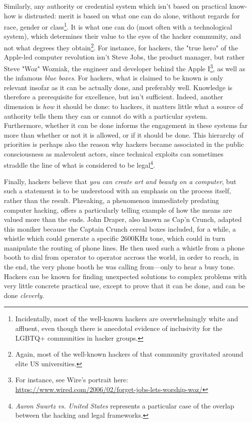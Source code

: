 \documentclass{article}
\begin{document}
Similarly, any authority or credential system which isn't based on practical know-how is distrusted: merit is based on what one can do alone, without regards for race, gender or class\footnote{Incidentally, most of the well-known hackers are overwhelmingly white and affluent, even though there is anecdotal evidence of inclusivity for the LGBTQ+ communities in hacker groups.}. It is what one can do (most often with a technological system), which determines their value to the eyes of the hacker community, and not what degrees they obtain\footnote{Again, most of the well-known hackers of that community gravitated around elite US universities.}. For instance, for hackers, the "true hero" of the Apple-led computer revolution isn't Steve Jobs, the product manager, but rather Steve "Woz" Wozniak, the engineer and developer behind the Apple I\footnote{For instance, see Wire's portrait here: \url{https://www.wired.com/2006/02/forget-jobs-lets-worship-woz/}}, as well as the infamous \emph{blue boxes}. For hackers, what is claimed to be known is only relevant insofar as it can be actually done, and preferably well. Knowledge is therefore a prerequisite for excellence, but isn't sufficient. Indeed, another dimension is \emph{how} it should be done: to hackers, it matters little what a source of authority tells them they can or cannot do with a particular system. Furthermore, whether it can be done informs the engagement in these systems far more than whether or not it is allowed, or if it should be done. This hierarchy of priorities is perhaps also the reason why hackers became associated in the public consciousness as malevolent actors, since technical exploits can sometimes straddle the line of what is considered to be legal\footnote{\emph{Aaron Swartz vs. United States} represents a particular case of the overlap between the hacking and legal frameworks.}.

Finally, hackers believe that \emph{you can create art and beauty on a computer}, but such a statement is to be understood with an emphasis on the process itself, rather than the result. Phreaking, a phenomenon immediately predating computer hacking, offers a particularly telling example of how the means are valued more than the ends. John Draper, also known as Cap'n Crunch, adapted this moniker because the Captain Crunch cereal boxes included, for a while, a whistle which could generate a specific 2600KHz tone, which could in turn manipulate the routing of phone lines. He then used such a whistle from a phone booth to dial from operator to operator accross the world, in order to reach, in the end, the very phone booth he was calling from—only to hear a busy tone\cite{rosenbaum_secrets_nodate}. Hackers can be known for finding unexpected solutions to complex problems with very little concrete practical use, except to prove that it can be done, and can be done \emph{cleverly}.
\end{document}
